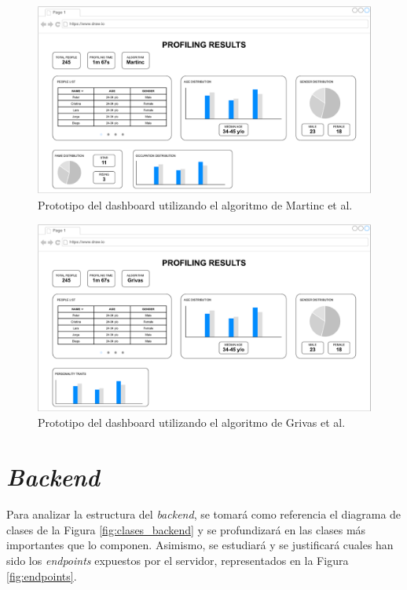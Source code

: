 \bigskip
\begin{figure}[H]
	\centering
	\includegraphics[width=\textwidth]{diagramas/dashboard-martinc.pdf}
	\caption{Prototipo del dashboard utilizando el algoritmo de Martinc et al. \cite{martinc2019hot}}
	\label{fig:prototipo_dashboard_martinc}
\end{figure}

\bigskip
\begin{figure}[H]
	\centering
	\includegraphics[width=\textwidth]{diagramas/dashboard-grivas.pdf}
	\caption{Prototipo del dashboard utilizando el algoritmo de Grivas et al. \cite{grivas2015author}}
	\label{fig:prototipo_dashboard_grivas}
\end{figure}

\section{\textit{Backend}}

Para analizar la estructura del \textit{backend}, se tomará como referencia el diagrama de clases de la Figura \ref{fig:clases_backend} y se profundizará
en las clases más importantes que lo componen. Asimismo, se estudiará y se justificará cuales han sido los \textit{endpoints} expuestos por el servidor,
representados en la Figura \ref{fig:endpoints}.

